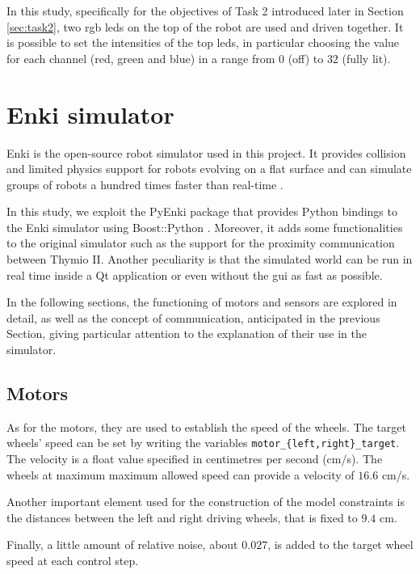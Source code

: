 In this study, specifically for the objectives of Task 2 introduced later in Section 
\ref{sec:task2}, two \gls{rgb} \glspl{led} on the top of the robot are used and 
driven together.
It is possible to set the intensities of the top \glspl{led}, in particular choosing the 
value for each channel (red, green and blue) in a range from $0$ (off) to $32$ 
(fully lit).

\section{Enki simulator}
\label{sec:enki}

Enki is the open-source robot simulator used in this project. It provides collision 
and limited physics support for robots evolving on a flat surface and can simulate 
groups of robots a hundred times faster than real-time \cite[see][]{enki}.

In this study, we exploit the PyEnki package \cite[][]{enki-jguzzi} that provides 
Python bindings to the Enki simulator using Boost::Python 
\cite[see][]{boostpython}.
Moreover, it adds some functionalities to the original simulator such as the 
support for the proximity communication between Thymio II.
Another peculiarity is that the simulated world can be run in real time inside a Qt 
application or even without the \gls{gui} as fast as possible.

In the following sections, the functioning of motors and sensors are explored in 
detail, as well as the concept of communication, anticipated in the previous 
Section, giving particular attention to the explanation of their use in the simulator.

\subsection{Motors}
\label{subsec:enkimotors}
As for the motors, they are used to establish the speed of the wheels. The target 
wheels' speed can be set by writing the variables 
\texttt{motor\_\{left,right\}\_target}. The velocity is a float value specified in 
centimetres per second (\gls{cm/s}).
The wheels at maximum maximum allowed speed can provide a velocity of 
$16.6$ \gls{cm/s}.

Another important element used for the construction of the model constraints is 
the distances between the left and right driving wheels, that is fixed to $9.4$ 
\gls{cm}.

Finally, a little amount of relative noise, about $0.027$, is added to the target 
wheel speed at each control step.

